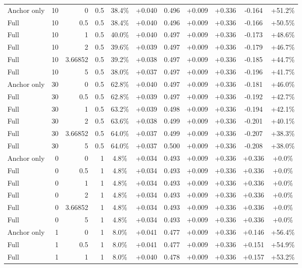 \begin{table}[htbp]
\begin{tabular}{lrrrccccccc}
Anchor only & 10 & 0 & 0.5 & 38.4\% & +0.040 & 0.496 & +0.009 & +0.336 & -0.164 & +51.2\% \\
Full & 10 & 0.5 & 0.5 & 38.4\% & +0.040 & 0.496 & +0.009 & +0.336 & -0.166 & +50.5\% \\
Full & 10 & 1 & 0.5 & 40.0\% & +0.040 & 0.497 & +0.009 & +0.336 & -0.173 & +48.6\% \\
Full & 10 & 2 & 0.5 & 39.6\% & +0.039 & 0.497 & +0.009 & +0.336 & -0.179 & +46.7\% \\
Full & 10 & 3.66852 & 0.5 & 39.2\% & +0.038 & 0.497 & +0.009 & +0.336 & -0.185 & +44.7\% \\
Full & 10 & 5 & 0.5 & 38.0\% & +0.037 & 0.497 & +0.009 & +0.336 & -0.196 & +41.7\% \\
Anchor only & 30 & 0 & 0.5 & 62.8\% & +0.040 & 0.497 & +0.009 & +0.336 & -0.181 & +46.0\% \\
Full & 30 & 0.5 & 0.5 & 62.8\% & +0.039 & 0.497 & +0.009 & +0.336 & -0.192 & +42.7\% \\
Full & 30 & 1 & 0.5 & 63.2\% & +0.039 & 0.498 & +0.009 & +0.336 & -0.194 & +42.1\% \\
Full & 30 & 2 & 0.5 & 63.6\% & +0.038 & 0.499 & +0.009 & +0.336 & -0.201 & +40.1\% \\
Full & 30 & 3.66852 & 0.5 & 64.0\% & +0.037 & 0.499 & +0.009 & +0.336 & -0.207 & +38.3\% \\
Full & 30 & 5 & 0.5 & 64.0\% & +0.037 & 0.500 & +0.009 & +0.336 & -0.208 & +38.0\% \\
Anchor only & 0 & 0 & 1 & 4.8\% & +0.034 & 0.493 & +0.009 & +0.336 & +0.336 & +0.0\% \\
Full & 0 & 0.5 & 1 & 4.8\% & +0.034 & 0.493 & +0.009 & +0.336 & +0.336 & +0.0\% \\
Full & 0 & 1 & 1 & 4.8\% & +0.034 & 0.493 & +0.009 & +0.336 & +0.336 & +0.0\% \\
Full & 0 & 2 & 1 & 4.8\% & +0.034 & 0.493 & +0.009 & +0.336 & +0.336 & +0.0\% \\
Full & 0 & 3.66852 & 1 & 4.8\% & +0.034 & 0.493 & +0.009 & +0.336 & +0.336 & +0.0\% \\
Full & 0 & 5 & 1 & 4.8\% & +0.034 & 0.493 & +0.009 & +0.336 & +0.336 & +0.0\% \\
Anchor only & 1 & 0 & 1 & 8.0\% & +0.041 & 0.477 & +0.009 & +0.336 & +0.146 & +56.4\% \\
Full & 1 & 0.5 & 1 & 8.0\% & +0.041 & 0.477 & +0.009 & +0.336 & +0.151 & +54.9\% \\
Full & 1 & 1 & 1 & 8.0\% & +0.040 & 0.478 & +0.009 & +0.336 & +0.157 & +53.2\% \\

\end{tabular}
\end{table}
